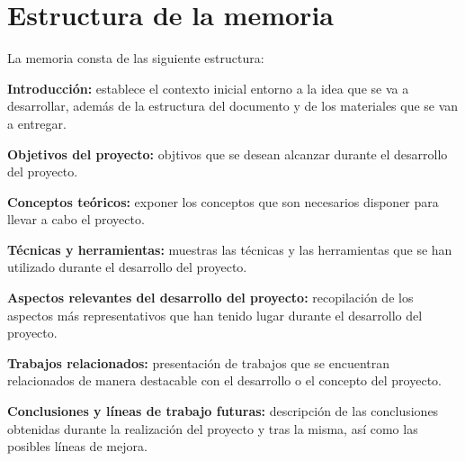 \section{Estructura de la memoria}
La memoria consta de las siguiente estructura:
\begin{list}{\textbullet}{ %
    \addtolength{\itemsep}{-2mm} %
    \setlength{\itemindent}{2mm}}

    \item \textbf{Introducción:} establece el contexto inicial entorno a la idea que se va a desarrollar, además de la estructura del documento y de los materiales que se van a entregar.
    \item \textbf{Objetivos del proyecto:} objtivos que se desean alcanzar durante el desarrollo del proyecto.
    \item \textbf{Conceptos teóricos:} exponer los conceptos que son necesarios disponer para llevar a cabo el proyecto.
    \item \textbf{Técnicas y herramientas:} muestras las técnicas y las herramientas que se han utilizado durante el desarrollo del proyecto.
    \item \textbf{Aspectos relevantes del desarrollo del proyecto:} recopilación de los aspectos más representativos que han tenido lugar durante el desarrollo del proyecto.
    \item \textbf{Trabajos relacionados:} presentación de trabajos que se encuentran relacionados de manera destacable con el desarrollo o el concepto del proyecto.
    \item \textbf{Conclusiones y líneas de trabajo futuras:} descripción de las conclusiones obtenidas durante la realización del proyecto y tras la misma, así como las posibles líneas de mejora.
\end{list}

